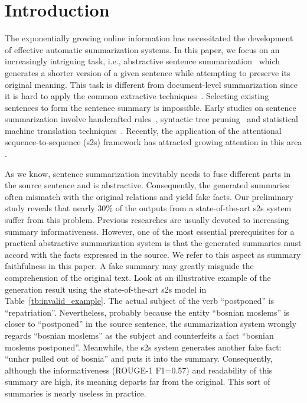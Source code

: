 \documentclass[letterpaper]{article} \usepackage{aaai18}  \usepackage{times}  \usepackage{helvet}  \usepackage{courier}  \usepackage{url}  \usepackage{graphicx}  \usepackage{amsfonts}
\begin{document}
	\section{Introduction}
	The exponentially growing online information has necessitated the development of effective automatic summarization systems.
In this paper, we focus on an increasingly intriguing task, i.e., abstractive sentence summarization~\cite{rush2015neural} which generates a shorter version of a given sentence while attempting to preserve its original meaning. 
This task is different from document-level summarization since it is hard to apply the common extractive techniques~\cite{over2001introduction}.
Selecting existing sentences to form the sentence summary is impossible.
Early studies on sentence summarization involve handcrafted rules~\cite{zajic2007multi}, syntactic tree pruning~\cite{knight2002summarization} and statistical machine translation techniques~\cite{banko2000headline}. 
Recently, the application of the attentional sequence-to-sequence (s2s) framework has attracted growing attention in this area \cite{rush2015neural,chopra2016abstractive,nallapati2016abstractive}.


As we know, sentence summarization inevitably needs to fuse different parts in the source sentence and is abstractive.
Consequently, the generated summaries often mismatch with the original relations and yield fake facts. 
Our preliminary study reveals that nearly 30\% of the outputs from a state-of-the-art s2s system suffer from this problem.
Previous researches are usually devoted to increasing summary informativeness. 
However, one of the most essential prerequisites for a practical abstractive summarization system is that the generated summaries must accord with the facts expressed in the source.
We refer to this aspect as summary faithfulness in this paper.
A fake summary may greatly misguide the comprehension of the original text.
Look at an illustrative example of the generation result using the state-of-the-art s2s model \cite{nallapati2016abstractive} in Table~\ref{tb:invalid_example}.
The actual subject of the verb ``postponed'' is ``repatriation''.
Nevertheless, probably because the entity ``bosnian moslems'' is closer to ``postponed'' in the source sentence, the summarization system wrongly regards ``bosnian moslems'' as the subject and counterfeits a fact ``bosnian moslems postponed''.
Meanwhile, the s2s system generates another fake fact: ``unhcr pulled out of bosnia'' and puts it into the summary.
Consequently, although the informativeness (ROUGE-1 F1=0.57) and readability of this summary are high, its meaning departs far from the original.
This sort of summaries is nearly useless in practice.
\end{document}
